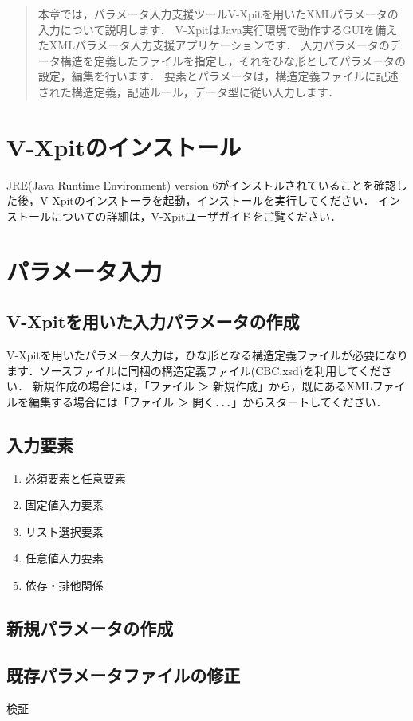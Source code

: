 \begin{abstract}
本章では，パラメータ入力支援ツールV-Xpitを用いたXMLパラメータの入力について説明します．
V-XpitはJava実行環境で動作するGUIを備えたXMLパラメータ入力支援アプリケーションです．
入力パラメータのデータ構造を定義したファイルを指定し，それをひな形としてパラメータの設定，編集を行います．
要素とパラメータは，構造定義ファイルに記述された構造定義，記述ルール，データ型に従い入力します．
\end{abstract}
%
\graphicspath{{./fig_Vxpit/}}

\section{V-Xpitのインストール}
\label{sec:install V-Xpit}

JRE(Java Runtime Environment) version 6がインストルされていることを確認した後，V-Xpitのインストーラを起動，インストールを実行してください．
インストールについての詳細は，V-Xpitユーザガイドをご覧ください．

\section{パラメータ入力}
\label{sec:parameter input}

\subsection{V-Xpitを用いた入力パラメータの作成}
V-Xpitを用いたパラメータ入力は，ひな形となる構造定義ファイルが必要になります．ソースファイルに同梱の構造定義ファイル(CBC.xsd)を利用してください．
新規作成の場合には，「ファイル ＞ 新規作成」から，既にあるXMLファイルを編集する場合には「ファイル ＞ 開く．．．」からスタートしてください．

\subsection{入力要素}

\begin{enumerate}
\item 必須要素と任意要素
\item 固定値入力要素
\item リスト選択要素
\item 任意値入力要素
\item 依存・排他関係
\end{enumerate}


\subsection{新規パラメータの作成}



\subsection{既存パラメータファイルの修正}


検証